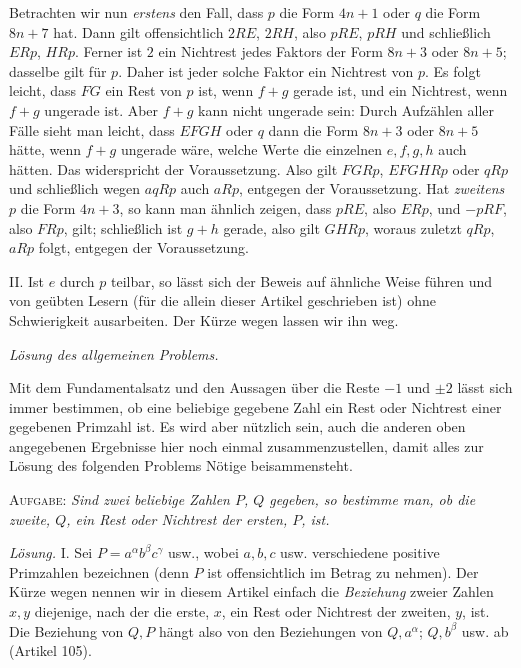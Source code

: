 Betrachten wir nun \textit{erstens} den Fall, dass $p$ die Form $4n+1$ oder $q$ die Form $8n+7$ hat. Dann gilt offensichtlich $2RE$, $2RH$, also $pRE$, $pRH$ und schließlich $ERp$, $HRp$. Ferner ist $2$ ein Nichtrest jedes Faktors der Form $8n+3$ oder $8n+5$; dasselbe gilt für $p$. Daher ist jeder solche Faktor ein Nichtrest von $p$. Es folgt leicht, dass $FG$ ein Rest von $p$ ist, wenn $f+g$ gerade ist, und ein Nichtrest, wenn $f+g$ ungerade ist. Aber $f+g$ kann nicht ungerade sein: Durch Aufzählen aller Fälle sieht man leicht, dass $EFGH$ oder $q$ dann die Form $8n+3$ oder $8n+5$ hätte, wenn $f+g$ ungerade wäre, welche Werte die einzelnen $e,f,g,h$ auch hätten. Das widerspricht der Voraussetzung. Also gilt $FGRp$, $EFGHRp$ oder $qRp$ und schließlich wegen $aqRp$ auch $aRp$, entgegen der Voraussetzung. Hat \textit{zweitens} $p$ die Form $4n+3$, so kann man ähnlich zeigen, dass $pRE$, also $ERp$, und $-pRF$, also $FRp$, gilt; schließlich ist $g+h$ gerade, also gilt $GHRp$, woraus zuletzt $qRp$, $aRp$ folgt, entgegen der Voraussetzung.

II. Ist $e$ durch $p$ teilbar, so lässt sich der Beweis auf ähnliche Weise führen und von geübten Lesern (für die allein dieser Artikel geschrieben ist) ohne Schwierigkeit ausarbeiten. Der Kürze wegen lassen wir ihn weg.

\begin{center}\textit{Lösung des allgemeinen Problems.}\end{center}

Mit dem Fundamentalsatz und den Aussagen über die Reste $-1$ und $\pm2$ lässt sich immer bestimmen, ob eine beliebige gegebene Zahl ein Rest oder Nichtrest einer gegebenen Primzahl ist. Es wird aber nützlich sein, auch die anderen oben angegebenen Ergebnisse hier noch einmal zusammenzustellen, damit alles zur Lösung des folgenden Problems Nötige beisammensteht.

\textsc{Aufgabe:} \textit{Sind zwei beliebige Zahlen $P$, $Q$ gegeben, so bestimme man, ob die zweite, $Q$, ein Rest oder Nichtrest der ersten, $P$, ist.}

\textit{Lösung.} I. Sei $P=a^{\alpha}b^{\beta}c^{\gamma}$ usw., wobei $a,b,c$ usw. verschiedene positive Primzahlen bezeichnen (denn $P$ ist offensichtlich im Betrag zu nehmen). Der Kürze wegen nennen wir in diesem Artikel einfach die \textit{Beziehung} zweier Zahlen $x,y$ diejenige, nach der die erste, $x$, ein Rest oder Nichtrest der zweiten, $y$, ist. Die Beziehung von $Q,P$ hängt also von den Beziehungen von $Q,a^{\alpha}$; $Q,b^{\beta}$ usw. ab (Artikel 105).


